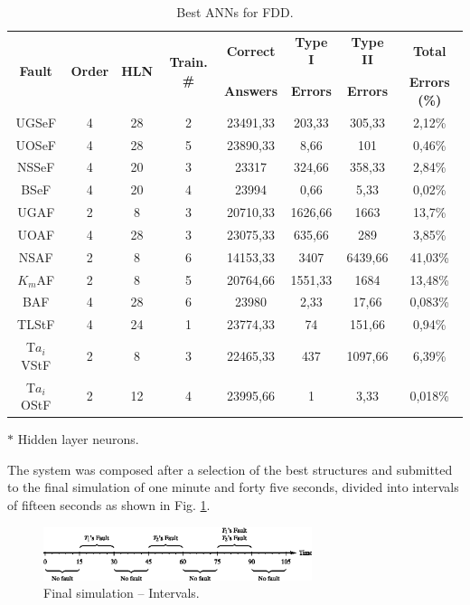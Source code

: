 \documentclass[10pt,fleqn,a4paper]{article}
\begin{document}
\begin{table}[htb]
\centering
\caption{Best ANNs for FDD.}
\label{tab:best_ann}
\begin{threeparttable}
\begin{tabular}{|c|c|c|c|c|c|c|c|}
\hline
\multirow{2}{*}{\bf Fault} &
\multirow{2}{*}{\bf Order} &
\multirow{2}{*}{{\bf HLN}\tnote{$*$}} &
\multirow{2}{*}{\bf Train. \#} &
{\bf Correct} & {\bf Type I} & {\bf Type II} & {\bf Total}\\
& & & & {\bf Answers} & {\bf Errors} & {\bf Errors} & {\bf Errors (\%)}\\
\hline
UGSeF & 4 & 28 & 2 & 23491,33 & 203,33 & 305,33 & 2,12\%\\
\hline
UOSeF & 4 & 28 & 5 & 23890,33 & 8,66 & 101 & 0,46\%\\
\hline
NSSeF & 4 & 20 & 3 & 23317 & 324,66 & 358,33 & 2,84\%\\
\hline
BSeF & 4 & 20 & 4 & 23994 & 0,66 & 5,33 & 0,02\%\\
\hline
UGAF & 2 & 8 & 3 & 20710,33 & 1626,66 & 1663 & 13,7\%\\
\hline
UOAF & 4 & 28 & 3 & 23075,33 & 635,66 & 289 & 3,85\%\\
\hline
{NSAF} & 2 & 8 & 6 & 14153,33 & 3407 & 6439,66 & 41,03\%\\
\hline
$K_m$AF & 2 & 8 & 5 & 20764,66 & 1551,33 & 1684 & 13,48\%\\
\hline
BAF & 4 & 28 & 6 & 23980 & 2,33 & 17,66 & 0,083\%\\
\hline
TLStF & 4 & 24 & 1 & 23774,33 & 74 & 151,66 & 0,94\%\\
\hline
T$a_i$VStF & 2 & 8 & 3 & 22465,33 & 437 & 1097,66 & 6,39\%\\
\hline
T$a_i$OStF & 2 & 12 & 4 & 23995,66 & 1 & 3,33 & 0,018\%\\
\hline
\end{tabular}
\begin{tablenotes}
\item [$*$] Hidden layer neurons.
\end{tablenotes}
\end{threeparttable}
\end{table}

The system was composed after a selection of the best structures and submitted
to the final simulation of one minute and forty five seconds, divided into
intervals of fifteen seconds as shown in Fig. \ref{fig:intervals}.

\begin{figure}[htb]
\centering
    \includegraphics[width=0.7\textwidth]{imgs/intervals}
    \caption{Final simulation -- Intervals.}
    \label{fig:intervals}
\end{figure}
\end{document}
